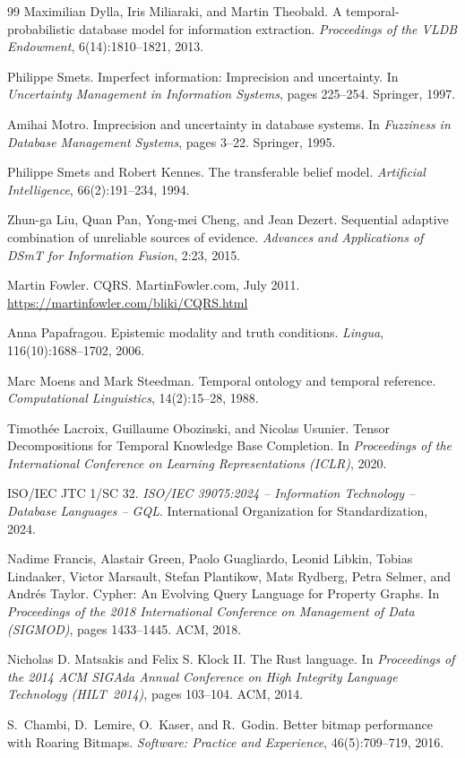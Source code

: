 \documentclass[a4paper,fleqn]{cas-sc}
\begin{document}
\begin{thebibliography}{99}
Maximilian Dylla, Iris Miliaraki, and Martin Theobald.
\newblock A temporal-probabilistic database model for information extraction.
\newblock \emph{Proceedings of the VLDB Endowment}, 6(14):1810--1821, 2013.

Philippe Smets.
\newblock Imperfect information: Imprecision and uncertainty.
\newblock In \emph{Uncertainty Management in Information Systems}, pages 225--254.
  Springer, 1997.

Amihai Motro.
\newblock Imprecision and uncertainty in database systems.
\newblock In \emph{Fuzziness in Database Management Systems}, pages 3--22.
  Springer, 1995.

Philippe Smets and Robert Kennes.
\newblock The transferable belief model.
\newblock \emph{Artificial Intelligence}, 66(2):191--234, 1994.

Zhun-ga Liu, Quan Pan, Yong-mei Cheng, and Jean Dezert.
\newblock Sequential adaptive combination of unreliable sources of evidence.
\newblock \emph{Advances and Applications of DSmT for Information Fusion}, 2:23, 2015.

Martin Fowler.
\newblock CQRS.
\newblock MartinFowler.com, July 2011.
\newblock \url{https://martinfowler.com/bliki/CQRS.html}

Anna Papafragou.
\newblock Epistemic modality and truth conditions.
\newblock \emph{Lingua}, 116(10):1688--1702, 2006.

Marc Moens and Mark Steedman.
\newblock Temporal ontology and temporal reference.
\newblock \emph{Computational Linguistics}, 14(2):15--28, 1988.

Timoth\'ee Lacroix, Guillaume Obozinski, and Nicolas Usunier.
\newblock Tensor Decompositions for Temporal Knowledge Base Completion.
\newblock In \emph{Proceedings of the International Conference on Learning Representations (ICLR)}, 2020.

ISO/IEC JTC 1/SC 32.
\newblock \emph{ISO/IEC 39075:2024 -- Information Technology -- Database Languages -- GQL}.
\newblock International Organization for Standardization, 2024.

Nadime Francis, Alastair Green, Paolo Guagliardo, Leonid Libkin, Tobias Lindaaker, Victor Marsault, Stefan Plantikow, Mats Rydberg, Petra Selmer, and Andr\'es Taylor.
\newblock Cypher: An Evolving Query Language for Property Graphs.
\newblock In \emph{Proceedings of the 2018 International Conference on Management of Data (SIGMOD)}, pages 1433--1445. ACM, 2018.

Nicholas D. Matsakis and Felix S. Klock II.
\newblock The Rust language.
\newblock In \emph{Proceedings of the 2014 ACM SIGAda Annual Conference on High Integrity Language Technology (HILT~2014)}, pages 103--104. ACM, 2014.

S.~Chambi, D.~Lemire, O.~Kaser, and R.~Godin.
\newblock Better bitmap performance with Roaring Bitmaps.
\newblock \emph{Software: Practice and Experience}, 46(5):709--719, 2016.

\end{thebibliography}
\end{document}
